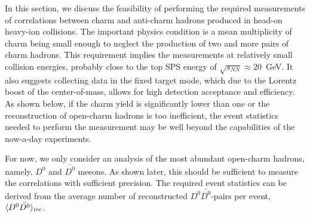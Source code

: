\documentclass[floatfix,superscriptaddress,a4paper,
               showpieces,showkeys,nofootinbib,preprint]{revtex4-2}
\begin{document}
In this section, we discuss the feasibility of performing the required measurements of correlations between charm and anti-charm hadrons produced in head-on heavy-ion collisions. The important physics condition is a mean multiplicity of charm being small enough to neglect the production of two and more pairs of charm hadrons. This requirement implies the measurements at relatively small collision energies, probably close to the top SPS energy of $\sqrt{s_{NN}} \approx 20$~GeV. It also suggests collecting data in the fixed target mode, which due to
the Lorentz boost of the center-of-mass, allows for high detection acceptance and efficiency. As shown below,
if the charm yield is significantly lower than one or the reconstruction of open-charm hadrons is too inefficient, the event statistics needed to perform the measurement may be well beyond the capabilities of the now-a-day experiments.

For now, we only consider an analysis of the most abundant open-charm hadrons, namely, $D^0$ and $\bar{D^0}$ mesons. As shown later, this should 
be sufficient to measure the correlations with sufficient precision.
The required event statistics can be derived from the average number of reconstructed $D^0\bar{D^0}$-pairs per event, $\langle D^0 \bar{D^0} \rangle_{\textnormal{rec}}$. 
\end{document}
